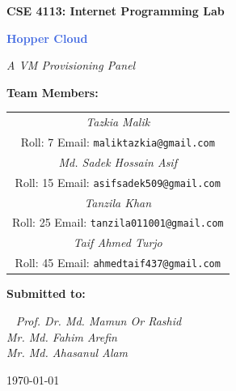 \documentclass[12pt,a4paper]{article}
\renewcommand{\arraystretch}{1.35}
\begin{document}
\begin{titlepage}
  \centering
 \vspace*{0cm}
  {\Large\textbf{CSE 4113: Internet Programming Lab}\par}
  \vspace{0.5cm}
  {\huge\textbf{\textcolor{RoyalBlue}{Hopper Cloud}}\par}
  \vspace{0.3cm}
  {\fontsize{15}{18}\selectfont\itshape A VM Provisioning Panel}\\[1.8cm]

  
  
  
  {\Large\textbf{Team Members:}\par}
  \vspace{0.5cm}
 
  {\large
\renewcommand{\arraystretch}{2}
\begin{tabular}{c}
\vspace{-0.5cm}
\textit{\Large Tazkia Malik} \\
Roll: 7 \quad Email: \texttt{maliktazkia@gmail.com}\\
\vspace{-0.5cm}
\textit{\Large Md. Sadek Hossain Asif} \\
Roll: 15 \quad Email: \texttt{asifsadek509@gmail.com}\\
\vspace{-0.5cm}
\textit{\Large Tanzila Khan} \\
Roll: 25 \quad Email: \texttt{tanzila011001@gmail.com}\\
\vspace{-0.5cm}
\textit{\Large Taif Ahmed Turjo} \\
Roll: 45 \quad Email: \texttt{ahmedtaif437@gmail.com}\\
\end{tabular}\par}
\vspace{2cm}



{\Large\textbf{Submitted to:}\par}\
\vspace{0.5cm}
\textit{ \large Prof. Dr. Md. Mamun Or Rashid}\\ 
\textit{ \large Mr. Md. Fahim Arefin}\\ \vspace{0.5cm}
\textit{ \large Mr. Md. Ahasanul Alam}\\ \vspace{0.5cm}

  \vfill
  {\footnotesize \large \today \par}
\end{titlepage}
\end{document}

